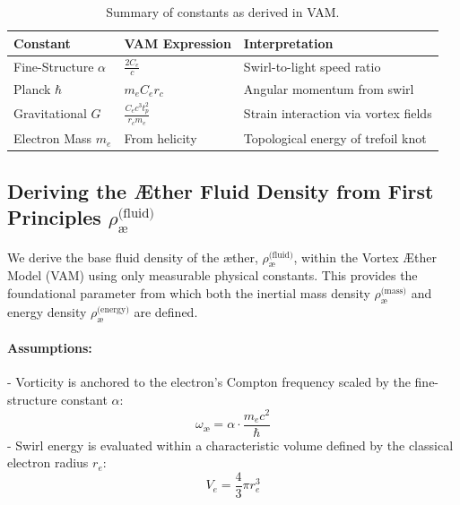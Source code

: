 \documentclass[preprint]{revtex4-2}
\begin{document}
            \begin{table}[H]
                \centering
                \begin{tabular}{|l|l|l|}
                    \hline
                    \textbf{Constant} & \textbf{VAM Expression} & \textbf{Interpretation} \\
                    \hline
                    Fine-Structure \( \alpha \) & \( \frac{2C_e}{c} \) & Swirl-to-light speed ratio \\
                    Planck \( \hbar \) & \( m_e C_e r_c \) & Angular momentum from swirl \\
                    Gravitational \( G \) & \( \frac{C_e c^3 t_p^2}{r_c m_e} \) & Strain interaction via vortex fields \\
                    Electron Mass \( m_e \) & From helicity & Topological energy of trefoil knot \\
                    \hline
                \end{tabular}
                \caption{Summary of constants as derived in VAM.}
                \label{tab:constants_summary}
            \end{table}
        
            \subsection{Deriving the Æther Fluid Density from First Principles \boldmath\( \rho_{\text{\ae}}^{\text{(fluid)}} \)}
                \label{sec:aether_fluid_density}
        
                We derive the base fluid density of the æther, \textbf{\boldmath\( \rho_{\text{\ae}}^{\text{(fluid)}} \)}, within the Vortex \AE{}ther Model (VAM) using only measurable physical constants. This provides the foundational parameter from which both the inertial mass density \textbf{\boldmath\( \rho_{\text{\ae}}^{\text{(mass)}} \)} and energy density \textbf{\boldmath\( \rho_{\text{\ae}}^{\text{(energy)}} \)} are defined.
        
                \paragraph{Assumptions:}
                - Vorticity is anchored to the electron’s Compton frequency scaled by the fine-structure constant \( \alpha \):
                \[
                \omega_{\text{\ae}} = \alpha \cdot \frac{m_e c^2}{\hbar}
                \]
                - Swirl energy is evaluated within a characteristic volume defined by the classical electron radius \( r_e \):
                \[
                V_e = \frac{4}{3} \pi r_e^3
                \]
        
\end{document}
